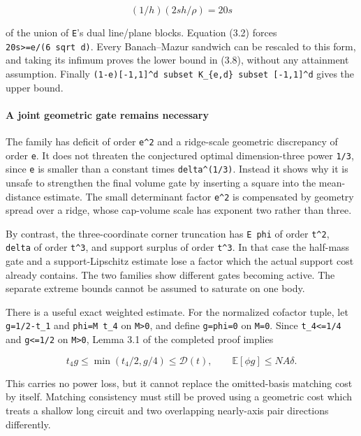 \documentclass[
  11pt,
]{article}
\begin{document}
\[
 (1/h)(2sh/\rho)=20s
\]

of the union of \texttt{E}'s dual line/plane blocks. Equation (3.2)
forces \texttt{20s\textgreater{}=e/(6\ sqrt\ d)}. Every Banach--Mazur
sandwich can be rescaled to this form, and taking its infimum proves the
lower bound in (3.8), without any attainment assumption. Finally
\texttt{(1-e){[}-1,1{]}\^{}d\ subset\ K\_\{e,d\}\ subset\ {[}-1,1{]}\^{}d}
gives the upper bound.

\paragraph{A joint geometric gate remains
necessary}\label{a-joint-geometric-gate-remains-necessary}

The family has deficit of order \texttt{e\^{}2} and a ridge-scale
geometric discrepancy of order \texttt{e}. It does not threaten the
conjectured optimal dimension-three power \texttt{1/3}, since \texttt{e}
is smaller than a constant times \texttt{delta\^{}(1/3)}. Instead it
shows why it is unsafe to strengthen the final volume gate by inserting
a square into the mean-distance estimate. The small determinant factor
\texttt{e\^{}2} is compensated by geometry spread over a ridge, whose
cap-volume scale has exponent two rather than three.

By contrast, the three-coordinate corner truncation has \texttt{E\ phi}
of order \texttt{t\^{}2}, \texttt{delta} of order \texttt{t\^{}3}, and
support surplus of order \texttt{t\^{}3}. In that case the half-mass
gate and a support-Lipschitz estimate lose a factor which the actual
support cost already contains. The two families show different gates
becoming active. The separate extreme bounds cannot be assumed to
saturate on one body.

There is a useful exact weighted estimate. For the normalized cofactor
tuple, let \texttt{g=1/2-t\_1} and \texttt{phi=M\ t\_4} on
\texttt{M\textgreater{}0}, and define \texttt{g=phi=0} on \texttt{M=0}.
Since \texttt{t\_4\textless{}=1/4} and \texttt{g\textless{}=1/2} on
\texttt{M\textgreater{}0}, Lemma 3.1 of the completed proof implies

\[
 t_4g\le\min(t_4/2,g/4)\le\mathscr D(t),
 \qquad \boxed{\mathbb E[\phi g]\le NA\delta.}
 \tag{3.1}
\]

This carries no power loss, but it cannot replace the omitted-basis
matching cost by itself. Matching consistency must still be proved using
a geometric cost which treats a shallow long circuit and two overlapping
nearly-axis pair directions differently.
\end{document}
